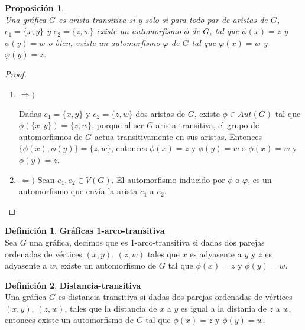 \documentclass[11pt]{book}
\newtheorem{proposition}{Proposición}
\theoremstyle{definition}
\newtheorem{definition}{Definición}
\begin{document}
\begin{proposition}\textbf{}\\
  Una gráfica $G$ es arista-transitiva si y solo si para todo par de
  aristas de $G$, $e_1=\{x,y\}$ y $e_2=\{z,w\}$ existe un automorfismo
  $\phi$ de $G$, tal que $\phi(x)=z$ y $\phi(y)=w$ o bien, existe un
  automorfismo $\varphi$ de $G$ tal que $\varphi(x)=w$ y
  $\varphi(y)=z$.
\end{proposition}

\begin{proof}

\begin{enumerate}

\item $\Rightarrow)$

Dadas $e_1=\{x,y\}$ y $e_2=\{z,w\}$ dos aristas de $G$,
existe $\phi\in Aut(G)$ tal que $\phi(\{x,y\})=\{z,w\}$, porque al ser
$G$ arista-transitiva, el grupo de automorfismos de $G$ actua
transitivamente en sus aristas. Entonces
$\{\phi(x),\phi(y)\}=\{z,w\}$, entonces $\phi(x)=z$ y $\phi(y)=w$ o
$\phi(x)=w$ y $\phi(y)=z$.

\item
$\Leftarrow)$
Sean $e_1,e_2\in V(G)$. El automorfismo inducido por $\phi$ o $\varphi$, es un
automorfismo que envía la arista $e_1$ a $e_2$.
\end{enumerate}
\end{proof}



\begin{definition}\textbf{Gráficas 1-arco-transitiva}\\
  Sea $G$ una gráfica, decimos que es 1-arco-transitiva si dadas dos
  parejas ordenadas de vértices $(x,y)$, $(z,w)$ tales que $x$
  es adyasente a $y$ y
  $z$ es adyasente a $w$, existe un automorfismo de $G$ tal que $\phi(x)=z$ y
  $\phi(y)=w$.
\end{definition}



\begin{definition}\textbf{Distancia-transitiva}\\
  Una gráfica $G$ es distancia-transitiva si dadas dos
  parejas ordenadas de vértices $(x,y)$, $(z,w)$, tales que la distancia de $x$
  a $y$ es igual a la distania de $z$ a $w$,
  entonces existe un automorfismo de $G$ tal que $\phi(x)=z$ y
  $\phi(y)=w$.
\end{definition}
\end{document}
